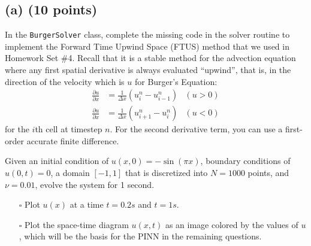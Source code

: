 \documentclass{article}
\begin{document}
\subsection*{(a) (10 points)}
In the \texttt{BurgerSolver} class, complete the missing code in the solver routine to implement the Forward Time Upwind Space (FTUS) method that we used in Homework Set \#4. Recall that it is a stable method for the advection equation where any first spatial derivative is always evaluated “upwind”, that is, in the direction of the velocity which is $u$ for Burger’s Equation:
\begin{align}
    \frac{\partial u}{\partial x} &= \frac{1}{\Delta x}(u^n_i - u^n_{i-1}) & (u > 0) \tag{2} \\
    \frac{\partial u}{\partial x} &= \frac{1}{\Delta x}(u^n_{i+1} - u^n_i) & (u < 0) \tag{3}
\end{align}
for the $i$th cell at timestep $n$. For the second derivative term, you can use a first-order accurate finite difference.

Given an initial condition of $u(x, 0) = -\sin(\pi x)$, boundary conditions of $u(0, t) = 0$, a domain $[-1, 1]$ that is discretized into $N = 1000$ points, and $\nu = 0.01$, evolve the system for 1 second.
\begin{itemize}
    \item[$\square$] Plot $u(x)$ at a time $t = 0.2s$ and $t = 1s$.
    \item[$\square$] Plot the space-time diagram $u(x, t)$ as an image colored by the values of $u$, which will be the basis for the PINN in the remaining questions.
\end{itemize}
\end{document}
